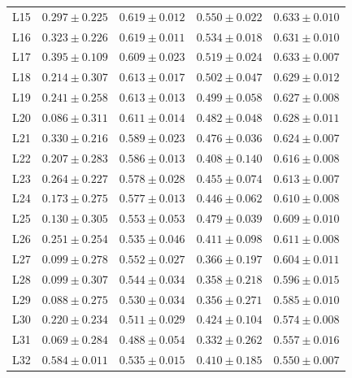 \begin{table}[h]
{\begin{tabular}{lcccc}
L15 & $0.297 \pm 0.225$ & $0.619 \pm 0.012$ & $0.550 \pm 0.022$ & $0.633 \pm 0.010$ \\
L16 & $0.323 \pm 0.226$ & $0.619 \pm 0.011$ & $0.534 \pm 0.018$ & $0.631 \pm 0.010$ \\
L17 & $0.395 \pm 0.109$ & $0.609 \pm 0.023$ & $0.519 \pm 0.024$ & $0.633 \pm 0.007$ \\
L18 & $0.214 \pm 0.307$ & $0.613 \pm 0.017$ & $0.502 \pm 0.047$ & $0.629 \pm 0.012$ \\
L19 & $0.241 \pm 0.258$ & $0.613 \pm 0.013$ & $0.499 \pm 0.058$ & $0.627 \pm 0.008$ \\
L20 & $0.086 \pm 0.311$ & $0.611 \pm 0.014$ & $0.482 \pm 0.048$ & $0.628 \pm 0.011$ \\
L21 & $0.330 \pm 0.216$ & $0.589 \pm 0.023$ & $0.476 \pm 0.036$ & $0.624 \pm 0.007$ \\
L22 & $0.207 \pm 0.283$ & $0.586 \pm 0.013$ & $0.408 \pm 0.140$ & $0.616 \pm 0.008$ \\
L23 & $0.264 \pm 0.227$ & $0.578 \pm 0.028$ & $0.455 \pm 0.074$ & $0.613 \pm 0.007$ \\
L24 & $0.173 \pm 0.275$ & $0.577 \pm 0.013$ & $0.446 \pm 0.062$ & $0.610 \pm 0.008$ \\
L25 & $0.130 \pm 0.305$ & $0.553 \pm 0.053$ & $0.479 \pm 0.039$ & $0.609 \pm 0.010$ \\
L26 & $0.251 \pm 0.254$ & $0.535 \pm 0.046$ & $0.411 \pm 0.098$ & $0.611 \pm 0.008$ \\
L27 & $0.099 \pm 0.278$ & $0.552 \pm 0.027$ & $0.366 \pm 0.197$ & $0.604 \pm 0.011$ \\
L28 & $0.099 \pm 0.307$ & $0.544 \pm 0.034$ & $0.358 \pm 0.218$ & $0.596 \pm 0.015$ \\
L29 & $0.088 \pm 0.275$ & $0.530 \pm 0.034$ & $0.356 \pm 0.271$ & $0.585 \pm 0.010$ \\
L30 & $0.220 \pm 0.234$ & $0.511 \pm 0.029$ & $0.424 \pm 0.104$ & $0.574 \pm 0.008$ \\
L31 & $0.069 \pm 0.284$ & $0.488 \pm 0.054$ & $0.332 \pm 0.262$ & $0.557 \pm 0.016$ \\
L32 & $0.584 \pm 0.011$ & $0.535 \pm 0.015$ & $0.410 \pm 0.185$ & $0.550 \pm 0.007$ \\
\bottomrule
\end{tabular}%
}
\end{table}

